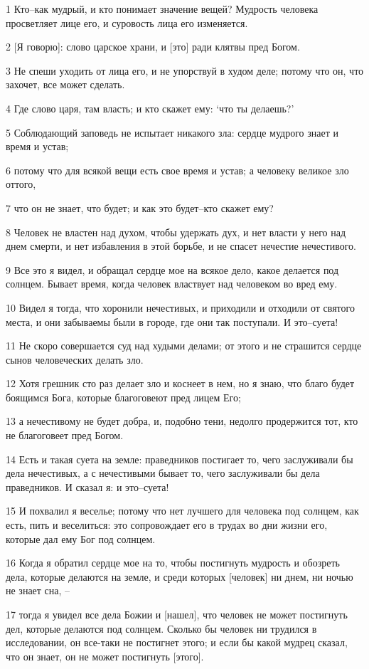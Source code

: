 \par 1 Кто--как мудрый, и кто понимает значение вещей? Мудрость человека просветляет лице его, и суровость лица его изменяется.
\par 2 [Я говорю]: слово царское храни, и [это] ради клятвы пред Богом.
\par 3 Не спеши уходить от лица его, и не упорствуй в худом деле; потому что он, что захочет, все может сделать.
\par 4 Где слово царя, там власть; и кто скажет ему: `что ты делаешь?'
\par 5 Соблюдающий заповедь не испытает никакого зла: сердце мудрого знает и время и устав;
\par 6 потому что для всякой вещи есть свое время и устав; а человеку великое зло оттого,
\par 7 что он не знает, что будет; и как это будет--кто скажет ему?
\par 8 Человек не властен над духом, чтобы удержать дух, и нет власти у него над днем смерти, и нет избавления в этой борьбе, и не спасет нечестие нечестивого.
\par 9 Все это я видел, и обращал сердце мое на всякое дело, какое делается под солнцем. Бывает время, когда человек властвует над человеком во вред ему.
\par 10 Видел я тогда, что хоронили нечестивых, и приходили и отходили от святого места, и они забываемы были в городе, где они так поступали. И это--суета!
\par 11 Не скоро совершается суд над худыми делами; от этого и не страшится сердце сынов человеческих делать зло.
\par 12 Хотя грешник сто раз делает зло и коснеет в нем, но я знаю, что благо будет боящимся Бога, которые благоговеют пред лицем Его;
\par 13 а нечестивому не будет добра, и, подобно тени, недолго продержится тот, кто не благоговеет пред Богом.
\par 14 Есть и такая суета на земле: праведников постигает то, чего заслуживали бы дела нечестивых, а с нечестивыми бывает то, чего заслуживали бы дела праведников. И сказал я: и это--суета!
\par 15 И похвалил я веселье; потому что нет лучшего для человека под солнцем, как есть, пить и веселиться: это сопровождает его в трудах во дни жизни его, которые дал ему Бог под солнцем.
\par 16 Когда я обратил сердце мое на то, чтобы постигнуть мудрость и обозреть дела, которые делаются на земле, и среди которых [человек] ни днем, ни ночью не знает сна, --
\par 17 тогда я увидел все дела Божии и [нашел], что человек не может постигнуть дел, которые делаются под солнцем. Сколько бы человек ни трудился в исследовании, он все-таки не постигнет этого; и если бы какой мудрец сказал, что он знает, он не может постигнуть [этого].

